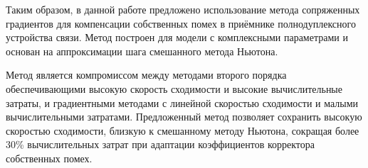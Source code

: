 Таким образом, в данной работе предложено использование метода сопряженных градиентов для компенсации собственных помех в приёмнике полнодуплексного устройства связи. Метод построен для модели с комплексными параметрами и основан на аппроксимации шага смешанного метода Ньютона.

Метод является компромиссом между методами второго порядка обеспечивающими высокую скорость сходимости и высокие вычислительные затраты, и градиентными методами с линейной скоростью сходимости и малыми вычислительными затратами. Предложенный метод позволяет сохранить высокую скоростью сходимости, близкую к смешанному методу Ньютона, сокращая более 30\% вычислительных затрат при адаптации коэффициентов корректора собственных помех.